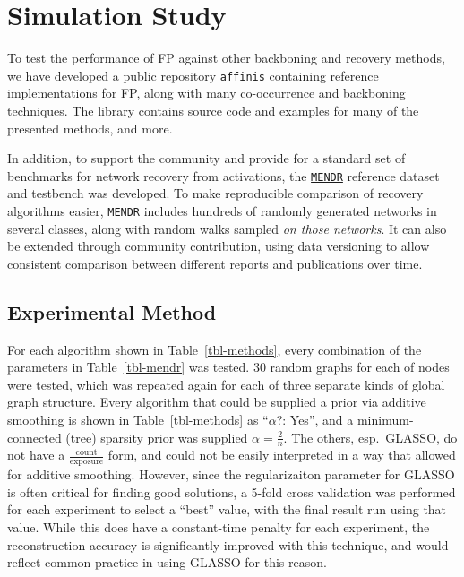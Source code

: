 \documentclass[%
	12pt,
		oneside,
		letterpaper
]{book}
\begin{document}
\section{Simulation Study}\label{sec-FP-experiments}

To test the performance of FP against other backboning and recovery
methods, we have developed a public repository
\href{https://github.com/rtbs-dev/affinis}{\texttt{affinis}} containing
reference implementations for FP, along with many co-occurrence and
backboning techniques. The library contains source code and examples for
many of the presented methods, and more.

In addition, to support the community and provide for a standard set of
benchmarks for network recovery from activations, the
\href{https://github.com/rtbs-dev/mendr}{\texttt{MENDR}} reference
dataset and testbench was developed. To make reproducible comparison of
recovery algorithms easier, \texttt{MENDR} includes hundreds of randomly
generated networks in several classes, along with random walks sampled
\emph{on those networks}. It can also be extended through community
contribution, using data versioning to allow consistent comparison
between different reports and publications over time.

\subsection{Experimental Method}\label{experimental-method}

For each algorithm shown in Table~\ref{tbl-methods}, every combination
of the parameters in Table~\ref{tbl-mendr} was tested. 30 random graphs
for each of nodes were tested, which was repeated again for each of
three separate kinds of global graph structure. Every algorithm that
could be supplied a prior via additive smoothing is shown in
Table~\ref{tbl-methods} as ``\(\alpha\)?: Yes'', and a minimum-connected
(tree) sparsity prior was supplied \(\alpha=\tfrac{2}{n}\). The others,
esp.~GLASSO, do not have a \(\tfrac{\text{count}}{\text{exposure}}\)
form, and could not be easily interpreted in a way that allowed for
additive smoothing. However, since the regularizaiton parameter for
GLASSO is often critical for finding good solutions, a 5-fold cross
validation was performed for each experiment to select a ``best'' value,
with the final result run using that value. While this does have a
constant-time penalty for each experiment, the reconstruction accuracy
is significantly improved with this technique, and would reflect common
practice in using GLASSO for this reason.
\end{document}
